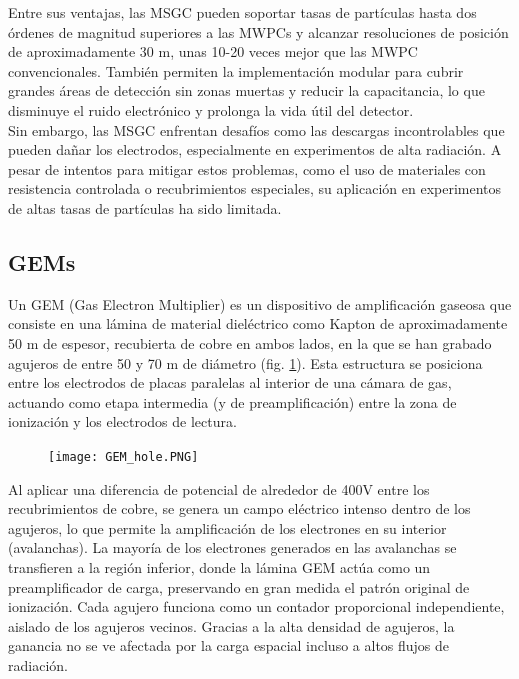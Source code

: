 \documentclass{article}
\begin{document}
\noindent Entre sus ventajas, las MSGC pueden soportar tasas de partículas hasta dos órdenes de magnitud superiores a las MWPCs y alcanzar resoluciones de posición de aproximadamente 30 \textmu m, unas 10-20 veces mejor que las MWPC convencionales. También permiten la implementación modular para cubrir grandes áreas de detección sin zonas muertas y reducir la capacitancia, lo que disminuye el ruido electrónico y prolonga la vida útil del detector.\\

\noindent Sin embargo, las MSGC enfrentan desafíos como las descargas incontrolables que pueden dañar los electrodos, especialmente en experimentos de alta radiación. A pesar de intentos para mitigar estos problemas, como el uso de materiales con resistencia controlada o recubrimientos especiales, su aplicación en experimentos de altas tasas de partículas ha sido limitada.\\

\subsection{GEMs}
\noindent Un GEM (Gas Electron Multiplier) es un dispositivo de amplificación gaseosa que consiste en una lámina de material dieléctrico como Kapton de aproximadamente 50 \textmu m de espesor, recubierta de cobre en ambos lados, en la que se han grabado agujeros de entre 50 y 70 \textmu m de diámetro (fig. \ref{fig:gem_hole}). Esta estructura se posiciona entre los electrodos de placas paralelas al interior de una cámara de gas, actuando como etapa intermedia (y de preamplificación) entre la zona de ionización y los electrodos de lectura.

\begin{figure}[H]
    \centering
    \texttt{[image: GEM\_hole.PNG]}
    \caption{}
    \label{fig:gem_hole}
\end{figure}
\noindent Al aplicar una diferencia de potencial de alrededor de 400V entre los recubrimientos de cobre, se genera un campo eléctrico intenso dentro de los agujeros, lo que permite la amplificación de los electrones en su interior (avalanchas). La mayoría de los electrones generados en las avalanchas se transfieren a la región inferior, donde la lámina GEM actúa como un preamplificador de carga, preservando en gran medida el patrón original de ionización. Cada agujero funciona como un contador proporcional independiente, aislado de los agujeros vecinos. Gracias a la alta densidad de agujeros, la ganancia no se ve afectada por la carga espacial incluso a altos flujos de radiación.\\ 
\end{document}

